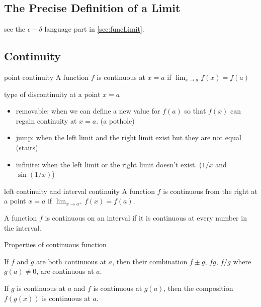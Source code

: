 \documentclass[Calculus 1 Recitation.tex]{subfiles}
\begin{document}
\subsection{The Precise Definition of a Limit}

see the $\epsilon-\delta$ language part in \autoref{sec:funcLimit}.

\subsection{Continuity}

\begin{myleftlinebox}
	point continuity
	\tcblower
	A function $f$ is continuous at $x=a$ if $\lim_{x\to a} f(x) = f(a)$
\end{myleftlinebox}

\begin{myleftlinebox}
	type of discontinuity at a point $x=a$
	\tcblower
	\begin{itemize}
		\item removable: when we can define a new value for $f(a)$ so that $f(x)$ can regain continuity at $x=a$. (a pothole)
		\item jump: when the left limit and the right limit exist but they are not equal (stairs)
		\item infinite: when the left limit or the right limit doesn't exist. ($1/x$ and $\sin(1/x)$)
	\end{itemize}
\end{myleftlinebox}

\begin{myleftlinebox}
	left continuity and interval continuity
	\tcblower
	A function $f$ is continuous from the right at a point $x=a$ if $\lim_{x\to a^+} f(x) = f(a)$.

	A function $f$ is continuous on an interval if it is continuous at every number in the interval.
\end{myleftlinebox}

\begin{myleftlinebox}
	Properties of continuous function
	\tcblower
	\begin{theorem}\label{thm:continFunc}
		If $f$ and $g$ are both continuous at $a$, then their combination $f\pm g$, $fg$, $f/g$ where $g(a)\neq 0$, are continuous at $a$.

		If $g$ is continuous at $a$ and $f$ is continuous at $g(a)$, then the composition $f(g(x))$ is continuous at $a$.
	\end{theorem}
\end{myleftlinebox}
\end{document}

